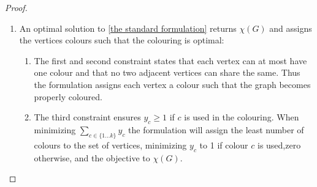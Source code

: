 \begin{proposition}
\begin{proof}
\begin{enumerate}
\item An optimal solution to \ref{the standard formulation} returns $\chi(G)$ and assigns the vertices colours such that the colouring is optimal:\\
\begin{enumerate}
\item The first and second constraint states that each vertex can at most have one colour and that no two adjacent vertices can share the same. Thus the formulation assigns each vertex a colour such that the graph becomes properly coloured.
\item The third constraint ensures $y_c \geq 1$ if $c$ is used in the colouring. When minimizing $\sum_{c\in \{1...k\}} y_c$ the formulation will assign the least number of colours to the set of vertices, minimizing $y_c$ to 1 if colour $c$ is used,zero otherwise, and the objective to $\chi(G)$.
\end{enumerate}
\end{enumerate}
\end{proof}
\end{proposition}

